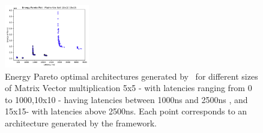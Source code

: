 \begin{figure}[tb] 
\centering
\includegraphics[width=0.33\textwidth]{graphs/EnergyParetoPlotMultipleSizeMAtrixVec.pdf}
    \caption{\small Energy Pareto optimal architectures generated by \frameworkname ~for different sizes of Matrix Vector multiplication 5x5 - with latencies ranging from 0 to 1000,10x10 - having latencies between 1000ns and 2500ns , and 15x15- with latencies above 2500ns. Each point corresponds to an architecture generated by the framework.}
\label{fig:sram_vs_mram_pareto_vec_sizes}
\end{figure}


